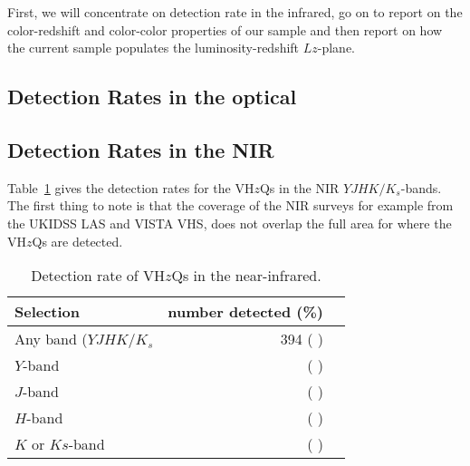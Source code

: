 \documentclass[usenatbib]{mnras}
\begin{document}
First, we will concentrate on detection rate in the infrared, go on to
report on the color-redshift and color-color properties of our sample
and then report on how the current sample populates the
luminosity-redshift $Lz$-plane.

    \subsection{Detection Rates in the optical}

    \subsection{Detection Rates in the NIR}
    Table~\ref{tab:nir_detection} gives the detection rates for the 
    VH$z$Qs in the NIR $YJHK/K_{s}$-bands. 
    The first thing to note is that the coverage of the NIR surveys 
    for example from the UKIDSS LAS and VISTA VHS, does
    not overlap the full area for where the VH$z$Qs are detected. 

    \begin{table}
          \centering

      \begin{tabular}{l r l}
        \hline  \hline
        Selection   & number detected (\%) \\
        \hline  
        Any band ($YJHK/K_{s}$   &  394  ( ) \\
        $Y$-band    &    ( ) \\
        $J$-band    &    ( ) \\
        $H$-band    &    ( ) \\
        $K$ or $Ks$-band    &    ( ) \\
        \hline  \hline
      \end{tabular}
      \caption{Detection rate of VH$z$Qs in the near-infrared.}
      \label{tab:nir_detection}
    \end{table}
\end{document}
